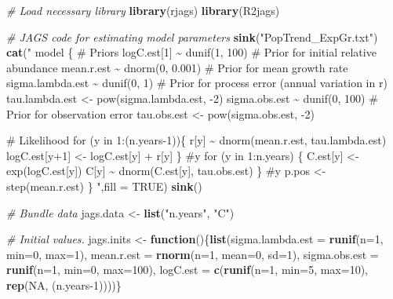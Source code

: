 \documentclass[
]{krantz}
\makeatletter
\newenvironment{Shaded}{\begin{snugshade}}{\end{snugshade}}
\newcommand{\AttributeTok}[1]{\textcolor[rgb]{0.27,0.27,0.27}{#1}}
\newcommand{\CommentTok}[1]{\textcolor[rgb]{0.37,0.37,0.37}{\textit{#1}}}
\newcommand{\ConstantTok}[1]{\textcolor[rgb]{0.37,0.37,0.37}{#1}}
\newcommand{\ControlFlowTok}[1]{\textcolor[rgb]{0.27,0.27,0.27}{\textbf{#1}}}
\newcommand{\DecValTok}[1]{\textcolor[rgb]{0.06,0.06,0.06}{#1}}
\newcommand{\FunctionTok}[1]{\textcolor[rgb]{0.27,0.27,0.27}{\textbf{#1}}}
\newcommand{\NormalTok}[1]{#1}
\newcommand{\OtherTok}[1]{\textcolor[rgb]{0.37,0.37,0.37}{#1}}
\newcommand{\StringTok}[1]{\textcolor[rgb]{0.5,0.5,0.5}{#1}}
\newenvironment{kframe}{%
\medskip{}
\setlength{\fboxsep}{.8em}
 \def\at@end@of@kframe{}%
 \ifinner\ifhmode%
  \def\at@end@of@kframe{\end{minipage}}%
  \begin{minipage}{\columnwidth}%
 \fi\fi%
 \def\FrameCommand##1{\hskip\@totalleftmargin \hskip-\fboxsep
 \colorbox{shadecolor}{##1}\hskip-\fboxsep
     \hskip-\linewidth \hskip-\@totalleftmargin \hskip\columnwidth}%
 \MakeFramed {\advance\hsize-\width
   \@totalleftmargin\z@ \linewidth\hsize
   \@setminipage}}%
 {\par\unskip\endMakeFramed%
 \at@end@of@kframe}
\renewenvironment{Shaded}{\begin{kframe}}{\end{kframe}}
\makeatother
\begin{document}
\begin{Shaded}
\begin{Highlighting}[]
\CommentTok{\# Load necessary library}
\FunctionTok{library}\NormalTok{(rjags)}
\FunctionTok{library}\NormalTok{(R2jags)}

\CommentTok{\# JAGS code for estimating model parameters}
\FunctionTok{sink}\NormalTok{(}\StringTok{"PopTrend\_ExpGr.txt"}\NormalTok{)}
\FunctionTok{cat}\NormalTok{(}\StringTok{"}
\StringTok{model \{}
\StringTok{\# Priors}
\StringTok{logC.est[1] \textasciitilde{} dunif(1, 100)     \# Prior for initial relative abundance}
\StringTok{mean.r.est \textasciitilde{} dnorm(0, 0.001)    \# Prior for mean growth rate}
\StringTok{sigma.lambda.est \textasciitilde{} dunif(0, 1)  \# Prior for process error (annual variation in r)}
\StringTok{tau.lambda.est \textless{}{-} pow(sigma.lambda.est, {-}2)}
\StringTok{sigma.obs.est \textasciitilde{} dunif(0, 100)     \# Prior for observation error}
\StringTok{tau.obs.est \textless{}{-} pow(sigma.obs.est, {-}2)}

\StringTok{\# Likelihood}
\StringTok{for (y in 1:(n.years{-}1))\{}
\StringTok{   r[y] \textasciitilde{} dnorm(mean.r.est, tau.lambda.est)}
\StringTok{   logC.est[y+1] \textless{}{-} logC.est[y] + r[y]}
\StringTok{   \} \#y}
\StringTok{for (y in 1:n.years) \{}
\StringTok{  C.est[y] \textless{}{-} exp(logC.est[y])}
\StringTok{  C[y] \textasciitilde{} dnorm(C.est[y], tau.obs.est)}
\StringTok{   \} \#y}
\StringTok{     p.pos \textless{}{-} step(mean.r.est)}
\StringTok{\}}
\StringTok{    "}\NormalTok{,}\AttributeTok{fill =} \ConstantTok{TRUE}\NormalTok{)}
\FunctionTok{sink}\NormalTok{()}

\CommentTok{\# Bundle data}
\NormalTok{jags.data }\OtherTok{\textless{}{-}} \FunctionTok{list}\NormalTok{(}\StringTok{"n.years"}\NormalTok{, }\StringTok{"C"}\NormalTok{)}

\CommentTok{\# Initial values.}
\NormalTok{jags.inits }\OtherTok{\textless{}{-}} \ControlFlowTok{function}\NormalTok{()\{}\FunctionTok{list}\NormalTok{(}\AttributeTok{sigma.lambda.est =} \FunctionTok{runif}\NormalTok{(}\AttributeTok{n=}\DecValTok{1}\NormalTok{, }\AttributeTok{min=}\DecValTok{0}\NormalTok{, }\AttributeTok{max=}\DecValTok{1}\NormalTok{), }
                              \AttributeTok{mean.r.est =} \FunctionTok{rnorm}\NormalTok{(}\AttributeTok{n=}\DecValTok{1}\NormalTok{, }\AttributeTok{mean=}\DecValTok{0}\NormalTok{, }\AttributeTok{sd=}\DecValTok{1}\NormalTok{),}
                              \AttributeTok{sigma.obs.est =} \FunctionTok{runif}\NormalTok{(}\AttributeTok{n=}\DecValTok{1}\NormalTok{, }\AttributeTok{min=}\DecValTok{0}\NormalTok{, }\AttributeTok{max=}\DecValTok{100}\NormalTok{),}
                              \AttributeTok{logC.est =} \FunctionTok{c}\NormalTok{(}\FunctionTok{runif}\NormalTok{(}\AttributeTok{n=}\DecValTok{1}\NormalTok{, }\AttributeTok{min=}\DecValTok{5}\NormalTok{, }\AttributeTok{max=}\DecValTok{10}\NormalTok{), }\FunctionTok{rep}\NormalTok{(}\ConstantTok{NA}\NormalTok{, (n.years}\DecValTok{{-}1}\NormalTok{))))\}}


\end{Highlighting}
\end{Shaded}
\end{document}
